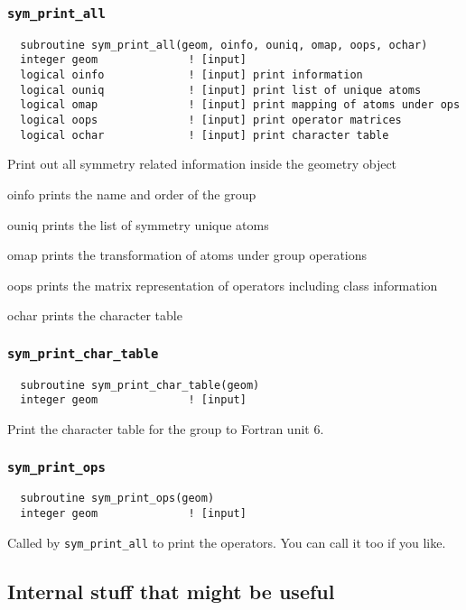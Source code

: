 \subsubsection{{\tt sym\_print\_all}}
\begin{verbatim}
  subroutine sym_print_all(geom, oinfo, ouniq, omap, oops, ochar)
  integer geom              ! [input]
  logical oinfo             ! [input] print information
  logical ouniq             ! [input] print list of unique atoms
  logical omap              ! [input] print mapping of atoms under ops
  logical oops              ! [input] print operator matrices
  logical ochar             ! [input] print character table
\end{verbatim}
Print out all symmetry related information inside the geometry object
\begin{description}
\item{oinfo} prints the name and order of the group
\item{ouniq} prints the list of symmetry unique atoms
\item{omap} prints the transformation of atoms under group operations
\item{oops} prints the matrix representation of operators including
  class information
\item{ochar} prints the character table
\end{description}

\subsubsection{{\tt sym\_print\_char\_table}}
\begin{verbatim}
  subroutine sym_print_char_table(geom)
  integer geom              ! [input]
\end{verbatim}
Print the character table for the group to Fortran unit 6.


\subsubsection{{\tt sym\_print\_ops}}
\begin{verbatim}
  subroutine sym_print_ops(geom)
  integer geom              ! [input]
\end{verbatim}
Called by \verb+sym_print_all+ to print the operators.  You can call
it too if you like.

\subsection{Internal stuff that might be useful}

